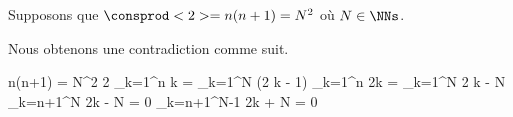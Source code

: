 Supposons que $\consprod<2> = n(n+1) = N^2$ où $N \in \NNs$.
 
\smallskip

Nous obtenons une contradiction comme suit.
	
\medskip
\noindent\kern-8pt%
\begin{stepcalc}[style = ar*, ope = \iff]
	n(n+1) = N^2
	2 \dsum_{k=1}^{n} k = \dsum_{k=1}^{N} (2 k - 1)
\explnext{}
	\dsum_{k=1}^{n} 2k = \dsum_{k=1}^{N} 2 k - N
	\dsum_{k=n+1}^{N} 2k - N = 0
	\dsum_{k=n+1}^{N-1} 2k + N = 0
\end{stepcalc}

\vspace{-2ex}	
\leavevmode